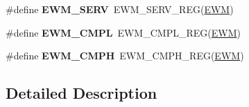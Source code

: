 \begin{DoxyCompactItemize}
\item 
\#define {\bfseries E\+W\+M\+\_\+\+S\+E\+RV}~E\+W\+M\+\_\+\+S\+E\+R\+V\+\_\+\+R\+EG(\hyperlink{group__EWM__Peripheral__Access__Layer_ga4c690a7633d3de9e8469adc23f784085}{E\+WM})\hypertarget{group__EWM__Register__Accessor__Macros_gad5ba7e470596823de41e4970dd7b8dee}{}\label{group__EWM__Register__Accessor__Macros_gad5ba7e470596823de41e4970dd7b8dee}

\item 
\#define {\bfseries E\+W\+M\+\_\+\+C\+M\+PL}~E\+W\+M\+\_\+\+C\+M\+P\+L\+\_\+\+R\+EG(\hyperlink{group__EWM__Peripheral__Access__Layer_ga4c690a7633d3de9e8469adc23f784085}{E\+WM})\hypertarget{group__EWM__Register__Accessor__Macros_ga80939a724dbc1614712bd9a4e148e95e}{}\label{group__EWM__Register__Accessor__Macros_ga80939a724dbc1614712bd9a4e148e95e}

\item 
\#define {\bfseries E\+W\+M\+\_\+\+C\+M\+PH}~E\+W\+M\+\_\+\+C\+M\+P\+H\+\_\+\+R\+EG(\hyperlink{group__EWM__Peripheral__Access__Layer_ga4c690a7633d3de9e8469adc23f784085}{E\+WM})\hypertarget{group__EWM__Register__Accessor__Macros_gaca7d16fcda675937b2e9df523618b7f9}{}\label{group__EWM__Register__Accessor__Macros_gaca7d16fcda675937b2e9df523618b7f9}

\end{DoxyCompactItemize}


\subsection{Detailed Description}
